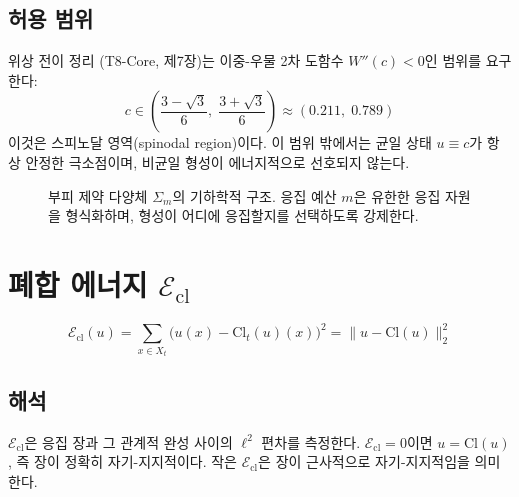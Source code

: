\subsection{허용 범위}

위상 전이 정리 (T8-Core, 제7장)는 이중-우물 2차 도함수 $W''(c) < 0$인 범위를 요구한다:
\begin{equation}
    c \in \left(\frac{3-\sqrt{3}}{6},\; \frac{3+\sqrt{3}}{6}\right) \approx (0.211,\; 0.789)
    \label{eq:spinodal-range}
\end{equation}
이것은 스피노달 영역(spinodal region)이다. 이 범위 밖에서는 균일 상태 $u \equiv c$가 항상 안정한 극소점이며, 비균일 형성이 에너지적으로 선호되지 않는다.

\begin{figure}[t]
\centering
\caption{부피 제약 다양체 $\Sigma_m$의 기하학적 구조. 응집 예산 $m$은 유한한 응집 자원을 형식화하며, 형성이 어디에 응집할지를 선택하도록 강제한다.}
\label{fig:volume-constraint}
\end{figure}


\section{폐합 에너지 $\mathcal{E}_{\mathrm{cl}}$}
\label{sec:closure-energy}

\begin{equation}
    \mathcal{E}_{\mathrm{cl}}(u) = \sum_{x \in X_t} \big( u(x) - \mathrm{Cl}_t(u)(x) \big)^2 = \|u - \mathrm{Cl}(u)\|_2^2
    \label{eq:E-cl}
\end{equation}

\subsection{해석}

$\mathcal{E}_{\mathrm{cl}}$은 응집 장과 그 관계적 완성 사이의 $\ell^2$ 편차를 측정한다. $\mathcal{E}_{\mathrm{cl}} = 0$이면 $u = \mathrm{Cl}(u)$, 즉 장이 정확히 자기-지지적이다. 작은 $\mathcal{E}_{\mathrm{cl}}$은 장이 근사적으로 자기-지지적임을 의미한다.

